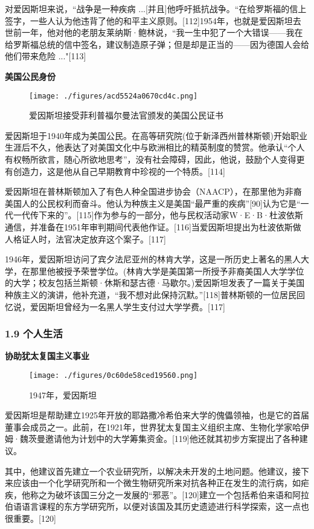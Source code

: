 对爱因斯坦来说，“战争是一种疾病 ...[并且]他呼吁抵抗战争。“在给罗斯福的信上签字，一些人认为他违背了他的和平主义原则。[112]1954年，也就是爱因斯坦去世前一年，他对他的老朋友莱纳斯·鲍林说，“我一生中犯了一个大错误——我在给罗斯福总统的信中签名，建议制造原子弹；但是却是正当的——因为德国人会给他们带来危险 ..."[113]

\textbf{美国公民身份}

\begin{figure}[ht]
\centering
\texttt{[image: ./figures/acd5524a0670cd4c.png]}
\caption{爱因斯坦接受菲利普福尔曼法官颁发的美国公民证书} \label{fig_AYST_13}
\end{figure}
爱因斯坦于1940年成为美国公民。在高等研究院(位于新泽西州普林斯顿)开始职业生涯后不久，他表达了对美国文化中与欧洲相比的精英制度的赞赏。他承认“个人有权畅所欲言，随心所欲地思考”，没有社会障碍，因此，他说，鼓励个人变得更有创造力，这是他从自己早期教育中珍视的一个特质。[114]

爱因斯坦在普林斯顿加入了有色人种全国进步协会（NAACP），在那里他为非裔美国人的公民权利而奋斗。他认为种族主义是美国“最严重的疾病”[90]认为它是“一代一代传下来的”。[115]作为参与的一部分，他与民权活动家W·E·B·杜波依斯通信，并准备在1951年审判期间代表他作证。[116]当爱因斯坦提出为杜波依斯做人格证人时，法官决定放弃这个案子。[117]

1946年，爱因斯坦访问了宾夕法尼亚州的林肯大学，这是一所历史上著名的黑人大学，在那里他被授予荣誉学位。(林肯大学是美国第一所授予非裔美国人大学学位的大学；校友包括兰斯顿·休斯和瑟古德·马歇尔。)爱因斯坦发表了一篇关于美国种族主义的演讲，他补充道，“我不想对此保持沉默。”[118]普林斯顿的一位居民回忆说，爱因斯坦曾经为一名黑人学生支付过大学学费。[117]

\subsubsection{1.9 个人生活}
\textbf{协助犹太复国主义事业}
\begin{figure}[ht]
\centering
\texttt{[image: ./figures/0c60de58ced19560.png]}
\caption{1947年，爱因斯坦} \label{fig_AYST_14}
\end{figure}
爱因斯坦是帮助建立1925年开放的耶路撒冷希伯来大学的傀儡领袖，也是它的首届董事会成员之一。此前，在1921年，世界犹太复国主义组织主席、生物化学家哈伊姆·魏茨曼邀请他为计划中的大学筹集资金。[119]他还就其初步方案提出了各种建议。

其中，他建议首先建立一个农业研究所，以解决未开发的土地问题。他建议，接下来应该由一个化学研究所和一个微生物研究所来对抗各种正在发生的流行病，如疟疾，他称之为破坏该国三分之一发展的“邪恶”。[120]建立一个包括希伯来语和阿拉伯语语言课程的东方学研究所，以便对该国及其历史遗迹进行科学探索，这一点也很重要。[120]

